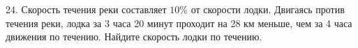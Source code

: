 24. Скорость течения реки составляет $10\%$ от скорости лодки. Двигаясь против течения реки, лодка за 3 часа 20 минут проходит на 28 км меньше, чем за 4 часа движения по течению. Найдите скорость лодки по течению.\\
